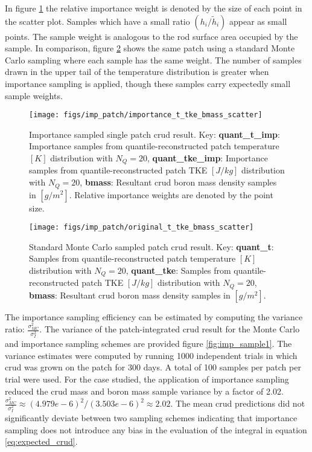 In figure \ref{fig:importancettkebmassscatter} the relative importance weight is denoted by the size of each point in the scatter plot.  Samples which have a small ratio $(h_i/\tilde h_i)$ appear as small points.  The sample weight is analogous to the rod surface area occupied by the sample.  In comparison, figure \ref{fig:originalttkebmassscatter} shows the same patch using a standard Monte Carlo sampling where each sample has the same weight.  The number of samples drawn in the upper tail of the temperature distribution is greater when importance sampling is applied, though these samples carry expectedly small sample weights.

\begin{figure}[H]
    \centering
    \texttt{[image: figs/imp\_patch/importance\_t\_tke\_bmass\_scatter]}
    \caption[Importance sampled single patch crud result.]{Importance sampled single patch crud result. Key: \textbf{quant\_t\_imp}: Importance samples from quantile-reconstructed patch temperature $[K]$ distribution with $N_Q=20$,  \textbf{quant\_tke\_imp}: Importance samples from quantile-reconstructed patch TKE $[J/kg]$ distribution with $N_Q=20$,  \textbf{bmass}:  Resultant crud boron mass density samples in $[g/m^2]$. Relative importance weights are denoted by the point size.}
    \label{fig:importancettkebmassscatter}
\end{figure}

\begin{figure}[H]
    \centering
    \texttt{[image: figs/imp\_patch/original\_t\_tke\_bmass\_scatter]}
    \caption[Standard Monte Carlo sampled patch crud result.]{Standard Monte Carlo sampled patch crud result. Key: \textbf{quant\_t}: Samples from quantile-reconstructed patch temperature $[K]$ distribution with $N_Q=20$,  \textbf{quant\_tke}: Samples from quantile-reconstructed patch TKE $[J/kg]$ distribution with $N_Q=20$,  \textbf{bmass}: Resultant crud boron mass density samples in $[g/m^2]$.  }
    \label{fig:originalttkebmassscatter}
\end{figure}

The importance sampling efficiency can be estimated by computing the variance ratio:  $\frac{\sigma^2_{MC}}{\sigma^2_{I}}$.  The variance of the patch-integrated crud result for the Monte Carlo and importance sampling schemes are provided figure \ref{fig:imp_sample1}.  The variance estimates were computed by running 1000 independent trials in which crud was grown on the patch for 300 days.  A total of 100 samples per patch per trial were used.  For the case studied, the application of importance sampling reduced the crud mass and boron mass sample variance by a factor of 2.02. $\frac{\sigma^2_{MC}}{\sigma^2_{I}} \approx (4.979e-6)^2 / (3.503e-6)^2  \approx 2.02$.  The mean crud predictions did not significantly deviate between two sampling schemes indicating that importance sampling does not introduce any bias in the evaluation of the integral in equation \ref{eq:expected_crud}.

